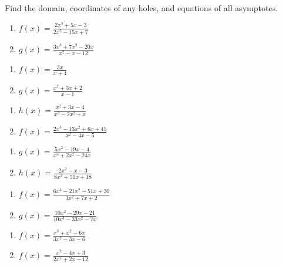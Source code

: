 Find the domain, coordinates of any holes, and equations of all asymptotes.
\begin{multicols}{2}
\begin{enumerate}
\setlength\itemsep{10pt}
	\item $f(x) = \frac{2x^2+5x-3}{2x^2-15x+7}$
	\item $g(x) = \frac{3x^3+7x^2-20x}{x^2-x-12}$
\end{enumerate} \setcounter{Review}{\value{enumi}}
\end{multicols}
\begin{multicols}{2}
\begin{enumerate}	\setcounter{enumi}{\value{Review}}
	\item $f(x) = \frac{3x}{x+4}$
	\item $g(x) = \frac{x^2+3x+2}{x-1}$
\end{enumerate} \setcounter{Review}{\value{enumi}}
\end{multicols}
\begin{multicols}{2}
\begin{enumerate}	\setcounter{enumi}{\value{Review}}
	\item $h(x) = \frac{x^2+3x-4}{x^3-2x^2+x}$
	\item $f(x) = \frac{2x^3-13x^2+6x+45}{x^2-4x-5}$
\end{enumerate} \setcounter{Review}{\value{enumi}}
\end{multicols}
\begin{multicols}{2}
\begin{enumerate}	\setcounter{enumi}{\value{Review}}
	\item $g(x) = \frac{5x^2-19x-4}{x^3+2x^2-24x}$
	\item $h(x) = \frac{2x^2-x-3}{8x^2+51x+18}$
\end{enumerate} \setcounter{Review}{\value{enumi}}
\end{multicols}
\begin{multicols}{2}
\begin{enumerate}	\setcounter{enumi}{\value{Review}}
	\item $f(x) = \frac{6x^3 - 21x^2 - 51x + 30}{3x^2+7x+2}$
	\item $g(x) = \frac{10x^2-29x-21}{10x^3-33x^2-7x}$
\end{enumerate} \setcounter{Review}{\value{enumi}}
\end{multicols}
\begin{multicols}{2}
\begin{enumerate}	\setcounter{enumi}{\value{Review}}
	\item $f(x) = \frac{x^3+x^2-6x}{3x^2-3x-6}$
	\item $f(x) = \frac{x^2-4x+3}{2x^2+2x-12}$
\end{enumerate} \setcounter{Review}{\value{enumi}}
\end{multicols}
